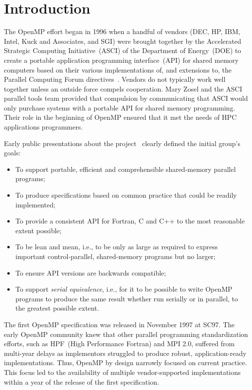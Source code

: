 \section{Introduction}
\label{sec:intro}

The OpenMP effort began in 1996 when a handful of vendors (DEC, HP, IBM, Intel,
Kuck and Associates, and SGI) were brought together by the Accelerated Strategic
Computing Initiative~(ASCI) of the Department of Energy~(DOE) to create a
portable application programming interface~(API) for shared memory computers
based on their various implementations of, and extensions to, the Parallel
Computing Forum directives~\cite{TheParallelComputingForum}. Vendors do not
typically work well together unless an outside force compels cooperation. Mary
Zosel and the ASCI parallel tools team provided that compulsion by communicating
that ASCI would only purchase systems with a portable API for shared memory
programming. Their role in the beginning of OpenMP ensured that it met the needs
of HPC applications programmers.

Early public presentations about the project~\cite{ewomp99} clearly
defined the initial group's goals:

\begin{itemize}
  \item To support portable, efficient and comprehensible shared-memory 
        parallel programs;
  \item To produce specifications based on common practice that 
        could be readily implemented;
  \item To provide a consistent API for Fortran, C and C++ to the 
        most reasonable extent possible;
  \item To be lean and mean, i.e., to  be only as large as required 
        to express important control-parallel, shared-memory programs  
        but no larger;
  \item To ensure API versions are backwards compatible;
  \item To support \emph{serial equivalence}, i.e., for it to be possible to
    write OpenMP programs to produce the same result whether run serially or in
        parallel, to the greatest possible extent.
\end{itemize}

The first OpenMP specification  was released in November 1997 at SC97. The
early OpenMP community knew that other parallel programming  standardization 
efforts, such as HPF~(High Performance Fortran) and MPI 2.0, suffered from 
multi-year delays as implementors struggled to produce robust, 
application-ready implementations. Thus, OpenMP by design narrowly focused 
on current practice. This focus led to the availability of multiple
vendor-supported implementations within a year of the release of the 
first specification. 

